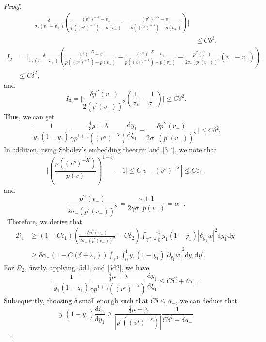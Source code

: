 \documentclass[10pt,reqno]{amsart}
\numberwithin{equation}{section}
\newcommand{\dif}{\mathrm{d}}
\begin{document}
\begin{proof}
\begin{align*}
\frac{\delta}{\sigma_\ast(v_--v_+)}\left(\frac{(v^s)^{-X}-v_-}{p((v^s)^{-X})-p(v_-)}
-\frac{(v^s)^{-X}-v_+}{p((v^s)^{-X})-p(v_+)}\right)\Big|\\
&\le C\delta^3,
\end{align*}
\begin{align*}
I_2&=\Big|\frac{\delta}{\sigma_\ast(v_--v_+)}\left(\frac{(v^s)^{-X}-v_-}{p((v^s)^{-X})-p(v_-)}
-\frac{(v^s)^{-X}-v_+}{p((v^s)^{-X})-p(v_+)}-\frac{ p^{\prime\prime}(v_-)}{2\sigma_\ast(p^\prime(v_-))^2}(v_--v_+)\right)\Big|\\
&\le C\delta^2,
\end{align*}
and
\[
I_3=\Big|\frac{\delta p^{\prime\prime}(v_-)}{2(p^\prime(v_-))^2}\left(\frac{1}{\sigma_\ast}-\frac{1}{\sigma_-}\right)\Big|\le C\delta^2.
\]
Thus, we can get
\begin{equation}\label{5d1}
\Big|\frac{1}{ y_1(1-y_1)}
\frac{\frac{4}{3}\mu+\lambda}{\gamma p^{1+\frac{1}{\gamma}}((v^s)^{-X})}\frac{\dif y_1}{\dif \xi_1}-\frac{\delta p^{\prime\prime}(v_-)}{2\sigma_-(p^\prime(v_-))^2}\Big|\le C\delta^2.
\end{equation}
In addition, using Sobolev's embedding theorem and \eqref{3.4}, we note that
\[
\Big|\left(\frac{p((v^s)^{-X})}{p(v)}\right)^{1+\frac{1}{\gamma}}-1\Big|\le C|v-(v^s)^{-X}|\le C\varepsilon_1,
\]
and
\begin{equation}\label{5d2}
\frac{p^{\prime\prime}(v_-)}{2\sigma_-(p^\prime(v_-))^2}=\frac{\gamma+1}{2\gamma\sigma_-p(v_-)}=\alpha_-.
\end{equation}\
Therefore, we derive that
\begin{equation}\label{d1}
\begin{aligned}
\mathcal{D}_1
&\ge (1-C\varepsilon_1)\left(\frac{\delta p^{\prime\prime}(v_-)}{2\sigma_-(p^\prime(v_-))^2}-C\delta_2\right)
\int_{\mathbb{T}^2}\int_0^1y_1(1-y_1)|\partial_{y_1}w|^2
\dif y_1\dif y^{\prime}\\
&\ge \delta\alpha_-(1-C(\delta+\varepsilon_1))\int_{\mathbb{T}^2}\int_0^1y_1(1-y_1)|\partial_{y_1}w|^2
\dif y_1\dif y^{\prime}.
\end{aligned}
\end{equation}
For $\mathcal{D}_2$, firstly, applying \eqref{5d1} and \eqref{5d2}, we have
\[
\frac{1}{ y_1(1-y_1)}
\frac{\frac{4}{3}\mu+\lambda}{\gamma p^{1+\frac{1}{\gamma}}((v^s)^{-X})}\frac{\dif y_1}{\dif \xi_1}\le C\delta^2+\delta\alpha_-.
\]
Subsequently, choosing $\delta$ small enough such that $C\delta\le \alpha_-$, we can deduce that
\[
y_1(1-y_1)\frac{\dif \xi_1}{\dif y_1}\ge
\frac{\frac{4}{3}\mu+\lambda}{|p^{\prime}((v^s)^{-X})|}\frac{1} {C\delta^2+\delta\alpha_-}
\]
\end{proof}
\end{document}
